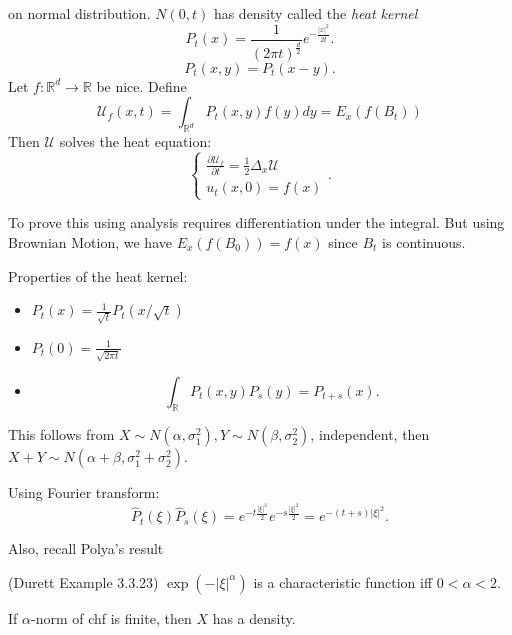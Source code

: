 \begin{remark}
	on normal distribution. $N(0,t)$ has density called the \textit{heat kernel}
	\[
		P_t(x) = \frac{1}{\left( 2 \pi t \right) ^{\frac{d}{2}}} e^{- \frac{|x|^2}{2 t}}
	.\] 
	\[
		P_t(x,y) = P_t(x-y)
	.\] 
	Let $f: \mathbb{R}^d \to \mathbb{R}$ be nice. Define
	\[
		\mathcal{U}_f(x,t) = \int_{\mathbb{R}^d} P_t(x,y) f(y) dy = E_x\left(f(B_t)\right)
	\]
	Then $\mathcal{U}$ solves the heat equation:
	\[
		\begin{cases}
			\frac{\partial \mathcal{U}_f}{\partial t} = \frac{1}{2} \Delta_x \mathcal{U} \\
			u_t(x,0) = f(x)
		\end{cases}
	.\] 

	To prove this using analysis requires differentiation under the integral. But using Brownian Motion, we have $E_x\left( f(B_0) \right) = f(x)$ since $B_t$ is continuous.
\end{remark}
Properties of the heat kernel:
\begin{itemize}
	\item $P_t(x) = \frac{1}{\sqrt{t} } P_t(x / \sqrt{t} )$
	\item $P_t(0) = \frac{1}{\sqrt{2 \pi t} }$ 
	\item {} 
		\[
			\int _{\mathbb{R}} P_t(x,y) P_s(y) = P_{t + s} (x)
		.\] 
\end{itemize}
This follows from $X\sim N(\alpha, \sigma^2_1), Y\sim N(\beta, \sigma^2_2)$, independent, then $X + Y \sim N(\alpha + \beta, \sigma^2_1 + \sigma^2_2)$.

Using Fourier transform:
\[
	\hat{P} _t(\xi) \hat{P} _s(\xi)
	= e^{- t \frac{|\xi|^2}{2}}e^{- s \frac{|\xi|^2}{2}}
	= e^{- (t + s) |\xi|^2}
.\] 

Also, recall Polya's result 
\begin{theorem}
	(Durett Example 3.3.23)
	$\exp(- |\xi|^\alpha)$ is a characteristic function iff $0 < \alpha < 2$.
\end{theorem}

If $\alpha$-norm of chf is finite, then $X$ has a density.


